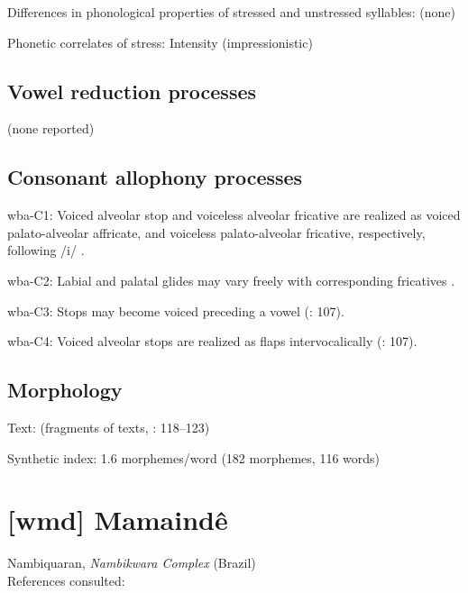 {\begin{appendixdesc}
\item[Differences in phonological properties of stressed and unstressed syllables:] (none)

\item[Phonetic correlates of stress:] Intensity (impressionistic)
\end{appendixdesc}
\subsection*{Vowel reduction processes}

(none reported)
\subsection*{Consonant allophony processes}
\begin{appendixdesc}

\item[wba-C1:] Voiced alveolar stop and voiceless alveolar fricative are realized as voiced palato-alveolar affricate, and voiceless palato-alveolar fricative, respectively, following /i/ \citep[121]{Arinterol2000}.

\item[wba-C2:] Labial and palatal glides may vary freely with corresponding fricatives \citep[122]{Arinterol2000}.

\item[wba-C3:] Stops may become voiced preceding a vowel (\citealt{Romero-Figeroa1997}: 107).

\item[wba-C4:] Voiced alveolar stops are realized as flaps intervocalically (\citealt{Romero-Figeroa1997}: 107).
\end{appendixdesc}
\subsection*{Morphology}

\begin{appendixdesc}

\item[Text:] (fragments of texts, \citealt{Romero-Figeroa1997}: 118--123)

\item[Synthetic index:] 1.6 morphemes/word (182 morphemes, 116 words)
\end{appendixdesc}

\section*{[wmd] Mamaindê} %
Nambiquaran, \textit{Nambikwara Complex} (Brazil)\medskip\\
References consulted: \citet{Eberhard2009}

}
